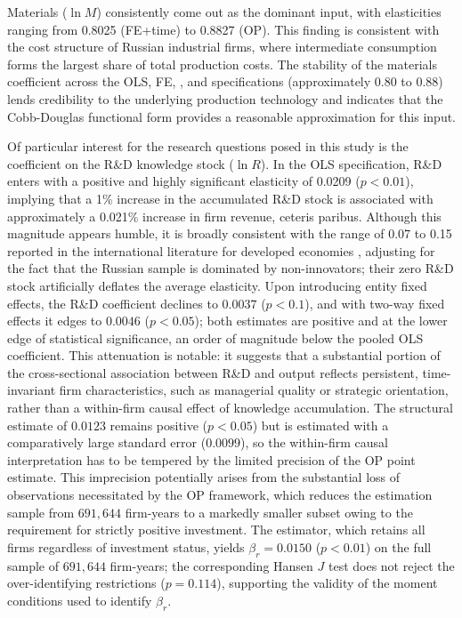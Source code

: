 \documentclass[a4paper, 12pt]{article}
\begin{document}
Materials ($\ln M$) consistently come out as the dominant input, with elasticities ranging from 0.8025 (FE+time) to 0.8827 (OP). This finding is consistent with the cost structure of Russian industrial firms, where intermediate consumption forms the largest share of total production costs. The stability of the materials coefficient across the OLS, FE, \textcite{olley1992dynamics}, and \textcite{doraszelski2013r} specifications (approximately 0.80 to 0.88) lends credibility to the underlying production technology and indicates that the Cobb-Douglas functional form provides a reasonable approximation for this input.

Of particular interest for the research questions posed in this study is the coefficient on the R\&D knowledge stock ($\ln R$). In the OLS specification, R\&D enters with a positive and highly significant elasticity of 0.0209 ($p < 0.01$), implying that a 1\% increase in the accumulated R\&D stock is associated with approximately a 0.021\% increase in firm revenue, ceteris paribus. Although this magnitude appears humble, it is broadly consistent with the range of 0.07 to 0.15 reported in the international literature for developed economies \parencite{Pieri2018Modelling, Kancs2016R&D}, adjusting for the fact that the Russian sample is dominated by non-innovators; their zero R\&D stock artificially deflates the average elasticity. Upon introducing entity fixed effects, the R\&D coefficient declines to $0.0037$ ($p < 0.1$), and with two-way fixed effects it edges to $0.0046$ ($p < 0.05$); both estimates are positive and at the lower edge of statistical significance, an order of magnitude below the pooled OLS coefficient. This attenuation is notable: it suggests that a substantial portion of the cross-sectional association between R\&D and output reflects persistent, time-invariant firm characteristics, such as managerial quality or strategic orientation, rather than a within-firm causal effect of knowledge accumulation. The \textcite{olley1992dynamics} structural estimate of $0.0123$ remains positive ($p < 0.05$) but is estimated with a comparatively large standard error ($0.0099$), so the within-firm causal interpretation has to be tempered by the limited precision of the OP point estimate. This imprecision potentially arises from the substantial loss of observations necessitated by the OP framework, which reduces the estimation sample from $691{,}644$ firm-years to a markedly smaller subset owing to the requirement for strictly positive investment. The \textcite{levinsohn2003estimating} estimator, which retains all firms regardless of investment status, yields $\beta_r = 0.0150$ ($p < 0.01$) on the full sample of $691{,}644$ firm-years; the corresponding Hansen $J$ test does not reject the over-identifying restrictions ($p = 0.114$), supporting the validity of the moment conditions used to identify $\beta_r$.
\end{document}

